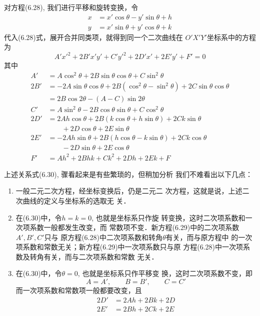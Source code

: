 对方程(6.28), 我们进行平移和旋转变换，令
\[\begin{split}
    x&=x'\cos\theta-y'\sin\theta+h\\
y&=x'\sin\theta+y'\cos\theta+k
\end{split}\]
代入(6.28)式，展开合并同类项，就得到同一个二次曲线在
$O'X'Y'$坐标系中的方程为
\begin{equation}
    A'{x'}^2+2B'x'y'+C'{y'}^2+2D'x'+2E'y'+F'=0
\end{equation}
其中
\begin{equation}
\begin{split}
    A'&=A\cos^2\theta +2B\sin\theta \cos\theta +C\sin^2\theta \\
2B'&=-2A\sin\theta \cos\theta +2B(\cos^2\theta -\sin^2\theta)+2C\sin\theta \cos\theta\\
 &=2B\cos2\theta-(A-C)\sin2\theta \\
C'&=A\sin^2\theta -2B\cos\theta \sin\theta +C\cos^2\theta \\
2D'&=2Ah\cos\theta +2B(k\cos\theta +h\sin\theta )+2Ck\sin\theta\\
&\qquad +2D\cos\theta +2E\sin\theta \\
2E'&=-2Ah\sin\theta +2B(h\cos\theta -k\sin\theta)+2Ck\cos\theta\\
&\qquad  -2D\sin\theta +2E\cos\theta \\
F'&=Ah^2+2Bhk+Ck^2+2Dh+2Ek+F
\end{split}
\end{equation}

上述关系式(6.30), 骤看起来是有些繁琐的，但稍加分析
我们不难看出以下几点：
\begin{enumerate}
\item 一般二元二次方程，经坐标变换后，仍是二元二
次方程，这就是说，上述二次曲线的定义与坐标系的选取无
关．
\item 在(6.30)中，令$h=k=0$, 也就是坐标系只作旋
转变换，这时二次项系数和一次项系数一般都发生改变，而
常数项不变．新方程(6.29)中的二次项系数$A',B',C'$只与
原方程(6.28)中二次项系数和转角$\theta$有关，而与原方程中
的一次项系数和常数无关；新方程(6.29)中一次项系数只与原
方程(6.28)中一次项系数及转角有关，而与二次项系数和常数
无关．
\item 在(6.30)中，令$\theta=0$, 也就是坐标系只作平移变
换，这时二次项系数不变，即
\[A=A',\qquad B=B',\qquad C=C'\]
而一次项系数和常数项一般都要改变，且
\begin{equation}
    \begin{split}
2D'&=2Ah+2Bk+2D\\
2E'&=2Bh+2Ck+2E        
    \end{split}
\end{equation}
\end{enumerate}

